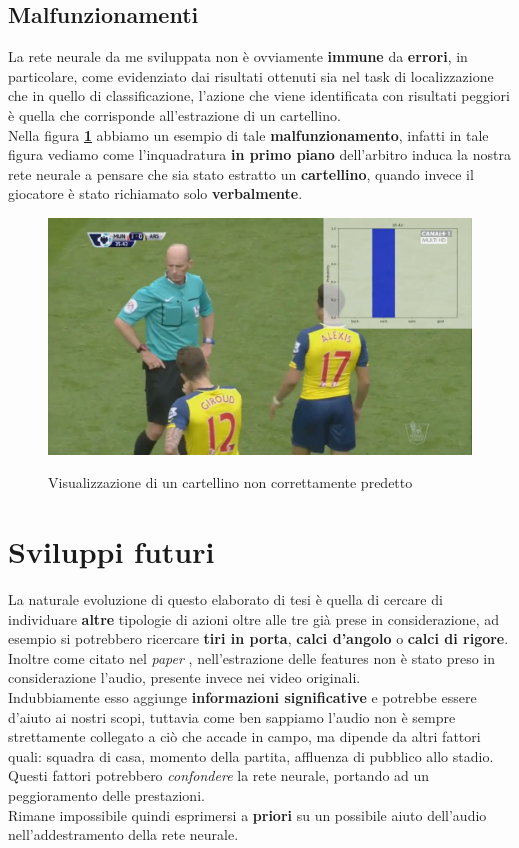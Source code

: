 \subsection{Malfunzionamenti}
La rete neurale da me sviluppata non è ovviamente \textbf{immune} da \textbf{errori}, in particolare, come evidenziato dai risultati ottenuti sia nel task di localizzazione che in quello di classificazione, l'azione che viene identificata con risultati peggiori è quella che corrisponde all'estrazione di un cartellino.
\\Nella figura \textbf{\ref{figure : fakecard}} abbiamo un esempio di tale \textbf{malfunzionamento}, infatti in tale figura vediamo come l'inquadratura \textbf{in primo piano} dell'arbitro induca la nostra rete neurale a pensare che sia stato estratto un \textbf{cartellino}, quando invece il giocatore è stato richiamato solo \textbf{verbalmente}.
\begin{figure}[H]
\centering
\caption{Visualizzazione di un cartellino non correttamente predetto}
\includegraphics[width=\linewidth]{img/fakecardHQ.png}
\label{figure : fakecard}
\end{figure}
\section{Sviluppi futuri}
La naturale evoluzione di questo elaborato di tesi è quella di cercare di individuare \textbf{altre} tipologie di azioni oltre alle tre già prese in considerazione, ad esempio si potrebbero ricercare \textbf{tiri in porta}, \textbf{calci d'angolo} o \textbf{calci di rigore}.
\\Inoltre come citato nel \textit{paper} \citep{soccerNet}, nell'estrazione delle features non è stato preso in considerazione l'audio, presente invece nei video originali.
\\Indubbiamente esso aggiunge \textbf{informazioni significative} e potrebbe essere d'aiuto ai nostri scopi, tuttavia come ben sappiamo l'audio non è sempre strettamente collegato a ciò che accade in campo, ma dipende da altri fattori quali: squadra di casa, momento della partita, affluenza di pubblico allo stadio.
\\Questi fattori potrebbero \textit{confondere} la rete neurale, portando ad un peggioramento delle prestazioni.
\\Rimane impossibile quindi esprimersi a \textbf{priori} su un possibile aiuto dell'audio nell'addestramento della rete neurale.
